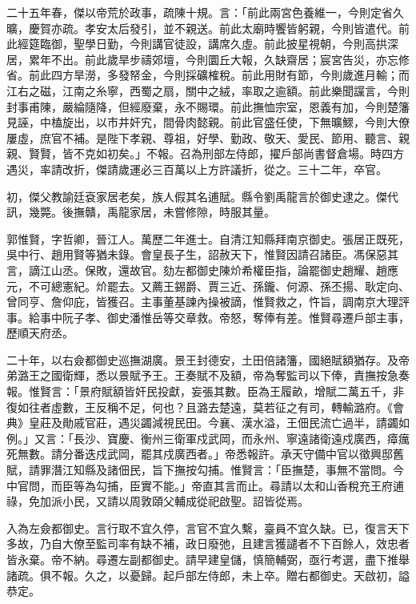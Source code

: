 \begin{pinyinscope}
二十五年春，傑以帝荒於政事，疏陳十規。言：「前此兩宮色養維一，今則定省久曠，慶賀亦疏。孝安太后發引，並不親送。前此太廟時饗皆躬親，今則皆遣代。前此經筵臨御，聖學日勤，今則講官徒設，講席久虛。前此披星視朝，今則高拱深居，累年不出。前此歲旱步禱郊壇，今則圜丘大報，久缺齋居；宸宮告災，亦忘修省。前此四方旱澇，多發帑金，今則採礦榷稅。前此用財有節，今則歲進月輸；而江右之磁，江南之糸寧，西蜀之扇，關中之絨，率取之逾額。前此樂聞讜言，今則封事甫陳，嚴綸隨降，但經廢棄，永不賜環。前此撫恤宗室，恩義有加，今則楚籓見誣，中榼旋出，以市井奸宄，間骨肉懿親。前此官盛任使，下無曠鰥，今則大僚屢虛，庶官不補。是陛下孝親、尊祖，好學、勤政、敬天、愛民、節用、聽言、親親、賢賢，皆不克如初矣。」不報。召為刑部左侍郎，擢戶部尚書督倉場。時四方遇災，率請改折，傑請歲運必三百萬以上方許議折，從之。三十二年，卒官。

初，傑父教諭廷袞家居老矣，族人假其名逋賦。縣令劉禹龍言於御史逮之。傑代訊，幾斃。後撫贛，禹龍家居，未嘗修隙，時服其量。

郭惟賢，字哲卿，晉江人。萬歷二年進士。自清江知縣拜南京御史。張居正既死，吳中行、趙用賢等猶未錄。會皇長子生，詔赦天下，惟賢因請召諸臣。馮保惡其言，謫江山丞。保敗，還故官。劾左都御史陳炌希權臣指，論罷御史趙耀、趙應元，不可總憲紀。炌罷去。又薦王錫爵、賈三近、孫鑨、何源、孫丕揚、耿定向、曾同亨、詹仰庇，皆獲召。主事董基諫內操被謫，惟賢救之，忤旨，調南京大理評事。給事中阮子孝、御史潘惟岳等交章救。帝怒，奪俸有差。惟賢尋遷戶部主事，歷順天府丞。

二十年，以右僉都御史巡撫湖廣。景王封德安，土田倍諸籓，國絕賦額猶存。及帝弟潞王之國衛輝，悉以景賦予王。王奏賦不及額，帝為奪監司以下俸，責撫按急奏報。惟賢言：「景府賦額皆奸民投獻，妄張其數。臣為王履畝，增賦二萬五千，非復如往者虛數，王反稱不足，何也？且潞去楚遠，莫若征之有司，轉輸潞府。《會典》皇莊及勛戚官莊，遇災蠲減視民田。今襄、漢水溢，王佃民流亡過半，請蠲如例。」又言：「長沙、寶慶、衡州三衛軍戍武岡，而永州、寧遠諸衛遠戍廣西，瘴癘死無數。請分番迭戍武岡，罷其戍廣西者。」帝悉報許。承天守備中官以徵興邸舊賦，請罪潛江知縣及諸佃民，旨下撫按勾捕。惟賢言：「臣撫楚，事無不當問。今中官問，而臣等為勾捕，臣實不能。」帝直其言而止。尋請以太和山香稅充王府逋祿，免加派小民，又請以周敦頤父輔成從祀啟聖。詔皆從焉。

入為左僉都御史。言行取不宜久停，言官不宜久繫，臺員不宜久缺。已，復言天下多故，乃自大僚至監司率有缺不補，政日廢弛，且建言獲譴者不下百餘人，效忠者皆永棄。帝不納。尋遷左副都御史。請早建皇儲，慎簡輔弼，亟行考選，盡下推舉諸疏。俱不報。久之，以憂歸。起戶部左侍郎，未上卒。贈右都御史。天啟初，謚恭定。


\end{pinyinscope}

